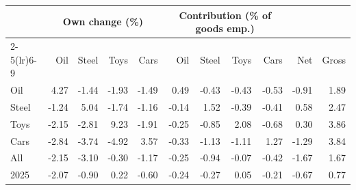 \begin{tabular}{lrrrrrrrrrr}
\toprule
 & \multicolumn{4}{c}{Own change (\%)} & \multicolumn{4}{c}{Contribution (\% of goods emp.)} & & \\
\cmidrule(lr){2-5}\cmidrule(lr){6-9}
 & Oil & Steel & Toys & Cars & Oil & Steel & Toys & Cars & Net & Gross \\
\midrule
Oil & 4.27 & -1.44 & -1.93 & -1.49 & 0.49 & -0.43 & -0.43 & -0.53 & -0.91 & 1.89 \\
Steel & -1.24 & 5.04 & -1.74 & -1.16 & -0.14 & 1.52 & -0.39 & -0.41 & 0.58 & 2.47 \\
Toys & -2.15 & -2.81 & 9.23 & -1.91 & -0.25 & -0.85 & 2.08 & -0.68 & 0.30 & 3.86 \\
Cars & -2.84 & -3.74 & -4.92 & 3.57 & -0.33 & -1.13 & -1.11 & 1.27 & -1.29 & 3.84 \\
All & -2.15 & -3.10 & -0.30 & -1.17 & -0.25 & -0.94 & -0.07 & -0.42 & -1.67 & 1.67 \\
2025 & -2.07 & -0.90 & 0.22 & -0.60 & -0.24 & -0.27 & 0.05 & -0.21 & -0.67 & 0.77 \\
\bottomrule
\end{tabular}
